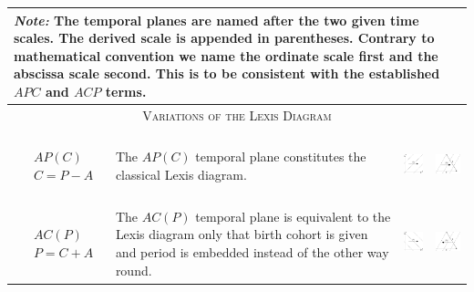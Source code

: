 \documentclass[
  12pt
]{scrartcl}
\begin{document}

\begin{center}
  \small
  \begin{longtable}{m{}m{}m{}m{}}
  \toprule
  \multicolumn{4}{m{0.9\textwidth}}{\footnotesize \emph{Note:} The temporal planes are named after the two given time scales. The derived scale is appended in parentheses. Contrary to mathematical convention we name the ordinate scale first and the abscissa scale second. This is to be consistent with the established $APC$ and $ACP$ terms.} \\
  \midrule
  \multicolumn{4}{c}{\textsc{Variations of the Lexis Diagram}} \\
  \midrule
  $$\begin{aligned}
    &AP(C) \\
    &C = P - A
  \end{aligned}$$ &
  The $AP(C)$ temporal plane constitutes the classical Lexis diagram. &
  \includegraphics[height = 2cm]{../fig/APc.pdf} &
  \includegraphics[height = 2cm]{../fig/APc_iso.pdf}  \\
  \midrule
  $$\begin{aligned}
    &AC(P) \\
    &P = C + A
  \end{aligned}$$ &
  The $AC(P)$ temporal plane is equivalent to the Lexis diagram only that birth cohort is given and period is embedded instead of the other way round. &
  \includegraphics[height = 2cm]{../fig/ACp.pdf} &
  \includegraphics[height = 2cm]{../fig/ACp_iso.pdf}  \\

\end{longtable}
\end{center}
\end{document}
